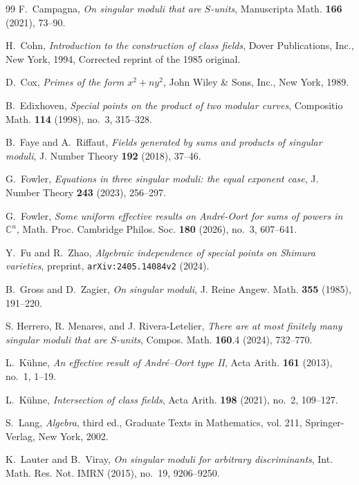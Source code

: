 \documentclass[12pt,a4paper,oneside]{amsart}
\begin{document}
\begin{thebibliography}{99}
	F.~Campagna, \emph{On singular moduli that are $S$-units}, Manuscripta Math. \textbf{166} (2021), 73--90.
	
	
	H.~Cohn, \emph{Introduction to the construction of class fields}, Dover
	Publications, Inc., New York, 1994, Corrected reprint of the 1985 original.
	
D.~Cox, \emph{Primes of the form {$x^2 + ny^2$}}, John Wiley \& Sons, Inc., New
  York, 1989.
  
B.~Edixhoven, \emph{Special points on the product of two modular curves},
  Compositio Math. \textbf{114} (1998), no.~3, 315--328.
	
	B.~Faye and A.~Riffaut, \emph{Fields generated by sums and products of singular
		moduli}, J. Number Theory \textbf{192} (2018), 37--46.
	
	G.~Fowler, \emph{Equations in three singular moduli: the equal exponent case},
	J. Number Theory \textbf{243} (2023), 256--297.
	
	G.~Fowler, \emph{Some uniform effective results on Andr\'e-Oort for sums of powers in $\mathbb{C}^n$}, Math. Proc. Cambridge Philos. Soc. {\bf 180} (2026), no.~3, 607--641.
		
Y.~Fu and R.~Zhao, \emph{Algebraic independence of special points on {S}himura
  varieties}, preprint, \texttt{ar{X}iv:2405.14084v2} (2024).
		
B.~Gross and D.~Zagier, \emph{On singular moduli}, J. Reine Angew. Math.
  \textbf{355} (1985), 191--220.
  
S. Herrero, R. Menares, and J. Rivera-Letelier, \emph{There are at most finitely many singular moduli that are $S$-units}, Compos. Math. \textbf{160}.4 (2024), 732--770.
  
		
L.~K{\"{u}}hne, \emph{An effective result of {A}ndr\'{e}--{O}ort type {II}},
  Acta Arith. \textbf{161} (2013), no.~1, 1--19.
	
	L.~K\"{u}hne, \emph{Intersection of class fields}, Acta Arith. \textbf{198}
	(2021), no.~2, 109--127.
	
	S.~Lang, \emph{Algebra}, third ed., Graduate Texts in Mathematics, vol. 211,
	Springer-Verlag, New York, 2002.
	
	    K.~Lauter and B.~Viray, \emph{On singular moduli for arbitrary discriminants}, Int. Math. Res. Not. IMRN (2015), no.~19, 9206--9250.
	

\end{thebibliography}
\end{document}

